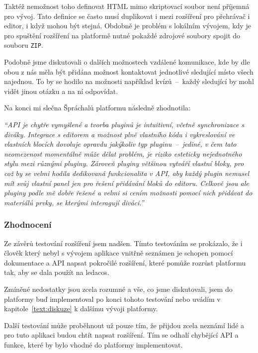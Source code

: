 Taktéž nemožnost toho definovat HTML mimo skriptovací soubor není příjemná pro vývoj.
Tato definice se často musí duplikovat i mezi rozšíření pro přehrávač i editor, i když mohou být stejná.
Obdobně je problém s lokálním vývojem, kdy je pro spuštění rozšíření na platformě nutné pokaždé zdrojové soubory spojit do souboru \verb|ZIP|.


Podobně jsme diskutovali o dalších možnostech vzdálené komunikace, kde by dle obou z nás měla být přidána možnost kontaktovat jednotlivé sledující místo všech najednou.
To by se hodilo na možnosti například kvízů~--~každý sledující by mohl vidět jinou otázku a na ní odpovídat.

Na konci mi slečna Špráchalů platformu následně zhodnotila:

\vspace{1em}

\textit{\enquote{API je chytře vymyšlené a tvorba pluginů je intuitivní, včetně synchronizace s diváky. Integrace s editorem a možnost plně vlastního kódu i vykreslování ve vlastních blocích dovoluje opravdu jakýkoliv typ pluginu~--~jediné, v čem tato neomezenost momentálně může dělat problém, je riziko esteticky nejednotného stylu mezi různými pluginy. Zároveň pluginy většinou vytváří vlastní bloky, pro což by se velmi hodila dedikovaná funkcionalita v API, aby každý plugin nemusel mít svůj vlastní panel jen pro řešení přidávání bloků do editoru.
Celkově jsou ale pluginy podle mě dobře řešené a velmi si cením možnosti pomocí nich přidávat do materiálů prvky, se kterými interagují diváci.}}


\subsubsection{Zhodnocení}

Ze závěrů testování rozšíření jsem nadšen.
Tímto testováním se prokázalo, že i člověk který nebyl s vývojem aplikace vnitřně seznámen je schopen pomocí dokumentace a API napsat pokročilé rozšíření, které pomůže rozrůst platformu tak, aby se dala použít na ledacos.

Zmíněné nedostatky jsou zcela rozumné a vše, co jsme diskutovali, jsem do platformy buď implementoval po konci tohoto testování nebo uvádím v kapitole~\ref{text:diskuze} k dalšímu vývoji platformy.

Další testování může proběhnout už pouze tím, že přijdou zcela neznámí lidé a pro tuto aplikaci budou chtít napsat rozšíření.
Tím se odhalí chybějící API a funkce, které by bylo vhodné do platformy implementovat.


